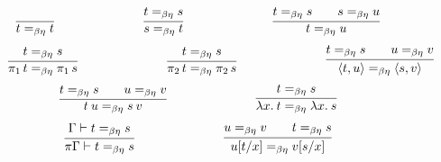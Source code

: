 \documentclass[a4paper, 11pt]{article}
\theoremstyle{definition}
\begin{document}
\begin{figure}
\begin{minipage}{1\textwidth}
        \begin{align*}
                \infer{t =_{\beta \eta} t}{}
                \hspace{2.5cm}
                \infer{s =_{\beta \eta} t}{t =_{\beta \eta} s}
                \hspace{2.5cm}
                \infer{t =_{\beta \eta} u}
                {
                        t =_{\beta \eta} s \qquad
                        s =_{\beta \eta} u
                }
        \end{align*}
        \begin{align*}
          \infer{\pi_1 \, t =_{\beta \eta} \pi_1 \, s}{
          t =_{\beta \eta} s} 
        \hspace{2.5cm}
          \infer{\pi_2 \, t =_{\beta \eta} \pi_2\, s}{
          t =_{\beta \eta} s} 
        \hspace{2.5cm}
        \infer{ \pv{t}{u} =_{\beta \eta} \pv{s}{v} }{
                          t =_{\beta \eta} s
                          \qquad
                          u =_{\beta \eta} v
                  }
        \end{align*}
        \begin{align*}
                \infer{ t \> u =_{\beta \eta} s \> v }{
                          t =_{\beta \eta} s
                          \qquad
                          u =_{\beta \eta} v
                  }
                \hspace{2.5cm}
                \infer {\lambda x. \> t =_{\beta \eta} \lambda x. \> s}{
                        t =_{\beta \eta} s
                }
        \end{align*}
        \begin{align*}
                \infer{
                        \pi \Gamma \vljud t =_{\beta \eta}  s
                }{
                        \Gamma \vljud t =_{\beta \eta} s
                }
                \hspace{2.5cm}
                \infer{
                        u[t/x] =_{\beta \eta} v[s/x]
                }{
                        u =_{\beta \eta} v \qquad t =_{\beta \eta} s
                }
        \end{align*}


\end{minipage}
\end{figure}
\end{document}

